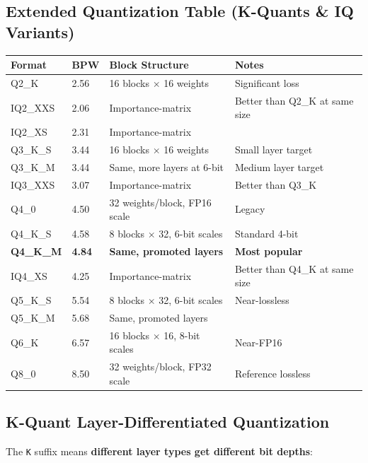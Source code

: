 \documentclass[11pt,a4paper]{article}
\begin{document}
\subsection{Extended Quantization Table (K-Quants \& IQ Variants)}

\begin{center}
\begin{tabular}{llL{3cm}L{4cm}}
\toprule
\textbf{Format} & \textbf{BPW} & \textbf{Block Structure} & \textbf{Notes} \\
\midrule
Q2\_K & 2.56 & 16 blocks $\times$ 16 weights & Significant loss \\
IQ2\_XXS & 2.06 & Importance-matrix & Better than Q2\_K at same size \\
IQ2\_XS & 2.31 & Importance-matrix & \\
Q3\_K\_S & 3.44 & 16 blocks $\times$ 16 weights & Small layer target \\
Q3\_K\_M & 3.44 & Same, more layers at 6-bit & Medium layer target \\
IQ3\_XXS & 3.07 & Importance-matrix & Better than Q3\_K \\
Q4\_0 & 4.50 & 32 weights/block, FP16 scale & Legacy \\
Q4\_K\_S & 4.58 & 8 blocks $\times$ 32, 6-bit scales & Standard 4-bit \\
\textbf{Q4\_K\_M} & \textbf{4.84} & \textbf{Same, promoted layers} & \textbf{Most popular} \\
IQ4\_XS & 4.25 & Importance-matrix & Better than Q4\_K at same size \\
Q5\_K\_S & 5.54 & 8 blocks $\times$ 32, 6-bit scales & Near-lossless \\
Q5\_K\_M & 5.68 & Same, promoted layers & \\
Q6\_K & 6.57 & 16 blocks $\times$ 16, 8-bit scales & Near-FP16 \\
Q8\_0 & 8.50 & 32 weights/block, FP32 scale & Reference lossless \\
\bottomrule
\end{tabular}
\end{center}

\subsection{K-Quant Layer-Differentiated Quantization}

The \texttt{K} suffix means \textbf{different layer types get different bit depths}:
\end{document}
